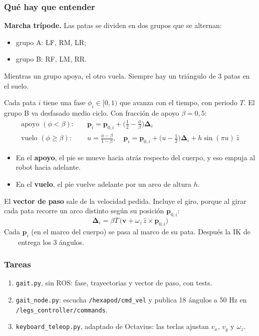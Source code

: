 \documentclass[11pt,a4paper]{article}
\newcommand{\pill}[2]{{\setlength{\fboxsep}{1.6pt}\colorbox{#1}{\textcolor{white}{\footnotesize\bfseries\,#2\,}}}}
\newcommand{\Eu}{\pill{cControl}{E1}}
\begin{document}
\subsubsection{Qué hay que entender}
\textbf{Marcha trípode.} Las patas se dividen en dos grupos que se alternan:
\begin{itemize}
  \item grupo A: LF, RM, LR;
  \item grupo B: RF, LM, RR.
\end{itemize}
Mientras un grupo apoya, el otro vuela. Siempre hay un triángulo de 3 patas en el suelo.

Cada pata $i$ tiene una fase $\phi_i \in [0,1)$ que avanza con el tiempo, con periodo $T$. El grupo B va desfasado medio ciclo. Con fracción de apoyo $\beta = 0{,}5$:
\begin{align}
\text{apoyo } (\phi < \beta):&\quad \mathbf p_i = \mathbf p_{0,i} + \Big(\tfrac12 - \tfrac{\phi}{\beta}\Big)\boldsymbol\Delta_i\\
\text{vuelo } (\phi \geq \beta):&\quad u = \tfrac{\phi-\beta}{1-\beta},\quad \mathbf p_i = \mathbf p_{0,i} + \Big(u-\tfrac12\Big)\boldsymbol\Delta_i + h\sin(\pi u)\,\hat z
\end{align}
\begin{itemize}
  \item En el \textbf{apoyo}, el pie se mueve hacia atrás respecto del cuerpo, y eso empuja al robot hacia adelante.
  \item En el \textbf{vuelo}, el pie vuelve adelante por un arco de altura $h$.
\end{itemize}

El \textbf{vector de paso} sale de la velocidad pedida. Incluye el giro, porque al girar cada pata recorre un arco distinto según su posición $\mathbf p_{0,i}$:
\begin{equation}
\boldsymbol\Delta_i = \beta T\,\big(\mathbf v + \omega_z\,\hat z \times \mathbf p_{0,i}\big)
\end{equation}
Cada $\mathbf p_i$ (en el marco del cuerpo) se pasa al marco de su pata. Después la IK de \Eu\ entrega los 3 ángulos.

\subsubsection{Tareas}
\begin{enumerate}[label=T\arabic*]
  \item \texttt{gait.py}, sin ROS: fase, trayectorias y vector de paso, con tests.
  \item \texttt{gait\_node.py}: escucha \texttt{/hexapod/cmd\_vel} y publica 18 ángulos a 50 Hz en \texttt{/legs\_controller/commands}.
  \item \texttt{keyboard\_teleop.py}, adaptado de Octavius: las teclas ajustan $v_x$, $v_y$ y $\omega_z$.
\end{enumerate}
\end{document}
